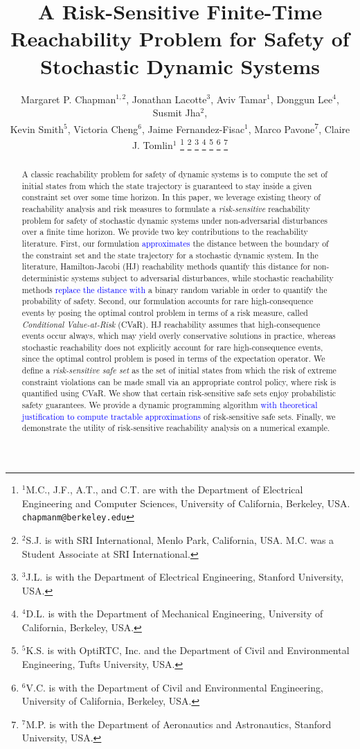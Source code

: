\documentclass[letterpaper, 10 pt, conference]{ieeeconf}  %
\title{\LARGE \bf
A Risk-Sensitive Finite-Time Reachability Problem for Safety of Stochastic Dynamic Systems}
\author{Margaret P. Chapman$^{1,2}$, Jonathan Lacotte$^{3}$, Aviv Tamar$^{1}$, Donggun Lee$^{4}$, Susmit Jha$^{2}$, \\
Kevin Smith$^{5}$, Victoria Cheng$^{6}$, Jaime Fernandez-Fisac$^{1}$, Marco Pavone\textsuperscript{7}, Claire J. Tomlin$^{1}$%
\thanks{$^{1}$M.C., J.F., A.T., and C.T. are with the Department of Electrical Engineering and Computer Sciences, University of California, Berkeley, USA.
        {\tt\small chapmanm@berkeley.edu}}%
\thanks{$^{2}$S.J. is with SRI International, Menlo Park, California, USA. M.C. was a Student Associate at SRI International.
        }%
\thanks{$^{3}$J.L. is with the Department of Electrical Engineering, Stanford University, USA.
        }%
\thanks{$^{4}$D.L. is with the Department of Mechanical Engineering, University of California, Berkeley, USA.
        }%
\thanks{$^{5}$K.S. is with OptiRTC, Inc. and the Department of Civil and Environmental Engineering, Tufts University, USA.
        }%
\thanks{$^{6}$V.C. is with the Department of Civil and Environmental Engineering, University of California, Berkeley, USA.
        }%
        \thanks{$^{7}$M.P. is with the Department of Aeronautics and Astronautics, Stanford University, USA.
        }%
}
\begin{document}
\maketitle
\thispagestyle{empty}
\pagestyle{empty}

\begin{abstract}
A classic reachability problem for safety of dynamic systems is to compute the set of initial states from which 
the state trajectory is guaranteed to stay inside a given constraint set over some time horizon. 
In this paper, we leverage existing theory of reachability analysis and risk measures 
to formulate a \textit{risk-sensitive} reachability problem for safety of stochastic dynamic systems under non-adversarial disturbances
over a finite time horizon.
We provide two key contributions to the reachability literature. 
First, our formulation \textcolor{blue}{approximates} the distance between the boundary of the constraint set and the state trajectory for a stochastic dynamic system.
In the literature, Hamilton-Jacobi (HJ) reachability methods quantify this distance for non-deterministic systems subject to adversarial disturbances, while
stochastic reachability methods \textcolor{blue}{replace the distance with} a binary random variable in order to quantify the probability of safety. 
Second, our formulation accounts for rare high-consequence events by posing the optimal control problem in terms of a risk measure, 
called \textit{Conditional Value-at-Risk} (CVaR).
HJ reachability assumes that high-consequence events occur always, which may yield overly conservative solutions in practice,
whereas stochastic reachability does not explicitly account for rare high-consequence events,
since the optimal control problem is posed in terms of the expectation operator.
We define a \textit{risk-sensitive safe set} as the set of initial states from which the risk of extreme constraint violations
can be made small via an appropriate control policy, where risk is quantified using CVaR.
We show that certain risk-sensitive safe sets enjoy probabilistic safety guarantees.
We provide a dynamic programming algorithm \textcolor{blue}{with theoretical justification to compute tractable approximations} of risk-sensitive safe sets. 
Finally, we demonstrate the utility of risk-sensitive reachability analysis on a numerical example.
\end{abstract}
\end{document}
